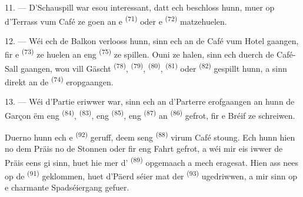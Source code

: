 \VUsaut{3.0mm}
\VUsaut{3.0mm}

11. --- D'Schauspill war esou interessant, datt ech beschloss hunn, muer op
d'Terrass vum Café ze goen an e  \textsuperscript{(71)} oder e
 \textsuperscript{(72)} matzehuelen.

12. --- Wéi ech de Balkon verlooss hunn, sinn ech an de Café vum Hotel gaangen, fir e
 \textsuperscript{(73)} ze huelen an eng 
\textsuperscript{(75)} ze spillen. Ouni ze halen, sinn ech duerch de Café-Sall
gaangen, wou vill Gäscht  \textsuperscript{(78)}, 
\textsuperscript{(79)},  \textsuperscript{(80)},
 \textsuperscript{(81)} oder 
\textsuperscript{(82)} gespillt hunn, a sinn direkt an de 
\textsuperscript{(74)} eropgaangen.

13. --- Wéi d'Partie eriwwer war, sinn ech an d'Parterre erofgaangen an hunn de
Garçon ëm eng  \textsuperscript{(84)}, 
\textsuperscript{(83)}, eng  \textsuperscript{(85)}, eng
 \textsuperscript{(87)} an  \textsuperscript{(86)}
gefrot, fir e Bréif ze schreiwen.

Duerno hunn ech e  \textsuperscript{(92)} geruff, deem seng
 \textsuperscript{(88)} virum Café stoung. Ech hunn hien no dem Präis
no de Stonnen oder fir eng Fahrt gefrot, a wéi mir eis iwwer de Präis eens gi sinn,
huet hie mer d' \textsuperscript{(89)} opgemaach a mech
eragesat. Hien ass nees op de  \textsuperscript{(91)} geklommen, huet
d'Päerd séier mat der  \textsuperscript{(93)} ugedriwwen, a mir sinn
op e charmante Spadséiergang gefuer.

\VUsaut{6.0mm}
\VUfilet{22mm}
